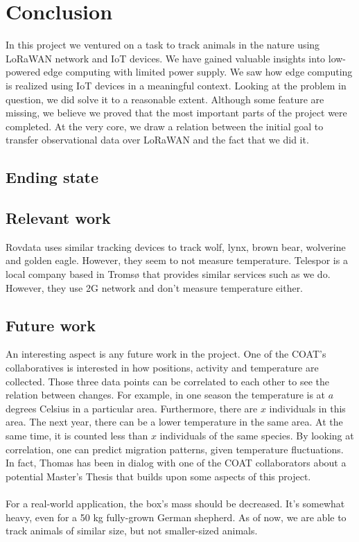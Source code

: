 \section{Conclusion}
	In this project we ventured on a task to track animals in the nature using LoRaWAN network and IoT devices. We have gained valuable insights into low-powered edge computing with limited power supply. We saw how edge computing is realized using IoT devices in a meaningful context. Looking  at the problem in question, we did solve it to a reasonable extent. Although some feature are missing, we believe we proved that the most important parts of the project were completed. At the very core, we draw a relation between the initial goal to transfer observational data over LoRaWAN and the fact that we did it. 

	\subsection{Ending state}
		

	\subsection{Relevant work}
		Rovdata uses similar tracking devices to track wolf, lynx, brown bear, wolverine and golden eagle. However, they seem to not measure temperature. Telespor is a local company based in Tromsø that provides similar services such as we do. However, they use 2G network and don't measure temperature either. 
	
	\subsection{Future work}
		An interesting aspect is any future work in the project. One of the COAT's collaboratives is interested in how positions, activity and temperature are collected. Those three data points can be correlated to each other to see the relation between changes. For example, in one season the temperature is at $a$ degrees Celsius in a particular area. Furthermore, there are $x$ individuals in this area. The next year, there can be a lower temperature in the same area. At the same time, it is counted less than $x$ individuals of the same species. By looking at correlation, one can predict migration patterns, given temperature fluctuations. In fact, Thomas has been in dialog with one of the COAT collaborators about a potential Master's Thesis that builds upon some aspects of this project. 
		\\\\
		For a real-world application, the box's mass should be decreased. It's somewhat heavy, even for a 50 kg fully-grown German shepherd. As of now, we are able to track animals of similar size, but not smaller-sized animals. 
		
